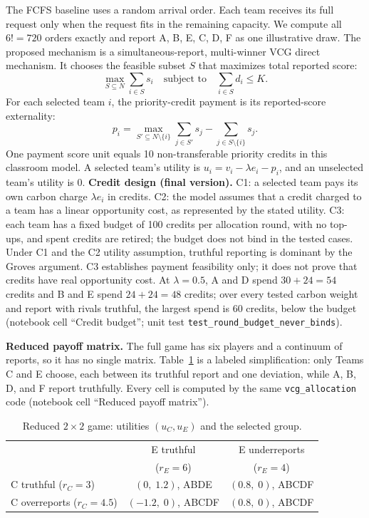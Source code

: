 The FCFS baseline uses a random arrival order. Each team receives its full request only when the request fits in the remaining capacity. We compute all $6!=720$ orders exactly and report A, B, E, C, D, F as one illustrative draw. The proposed mechanism is a simultaneous-report, multi-winner VCG direct mechanism. It chooses the feasible subset $S$ that maximizes total reported score:
\[
\max_{S \subseteq N}\sum_{i\in S}s_i
\quad \text{subject to} \quad
\sum_{i\in S}d_i\leq K.
\]
For each selected team $i$, the priority-credit payment is its reported-score externality:
\[
p_i=
\max_{S'\subseteq N\setminus\{i\}}\sum_{j\in S'}s_j
-
\sum_{j\in S\setminus\{i\}}s_j.
\]
One payment score unit equals 10 non-transferable priority credits in this classroom model. A selected team's utility is \ensuremath{u_i=v_i-\lambda e_i-p_i}, and an unselected team's utility is \ensuremath{0}. \textbf{Credit design (final version).} C1: a selected team pays its own carbon charge \ensuremath{\lambda e_i} in credits. C2: the model assumes that a credit charged to a team has a linear opportunity cost, as represented by the stated utility. C3: each team has a fixed budget of 100 credits per allocation round, with no top-ups, and spent credits are retired; the budget does not bind in the tested cases. Under C1 and the C2 utility assumption, truthful reporting is dominant by the Groves argument. C3 establishes payment feasibility only; it does not prove that credits have real opportunity cost. At \ensuremath{\lambda=0.5}, A and D spend \ensuremath{30+24=54} credits and B and E spend \ensuremath{24+24=48} credits; over every tested carbon weight and report with rivals truthful, the largest spend is 60 credits, below the budget (notebook cell ``Credit budget''; unit test \texttt{test\_round\_budget\_never\_binds}).

\textbf{Reduced payoff matrix.} The full game has six players and a continuum of reports, so it has no single matrix. Table~\ref{tab:matrix} is a labeled simplification: only Teams C and E choose, each between its truthful report and one deviation, while A, B, D, and F report truthfully. Every cell is computed by the same \texttt{vcg\_allocation} code (notebook cell ``Reduced payoff matrix'').

\begin{table}[h]
\centering
\caption{Reduced $2\times2$ game: utilities $(u_C,u_E)$ and the selected group.}
\label{tab:matrix}
\footnotesize
\setlength{\tabcolsep}{4pt}
\begin{tabular}{lcc}
\toprule
 & E truthful & E underreports \\
 & ($r_E=6$) & ($r_E=4$) \\
\midrule
C truthful ($r_C=3$) & $(0,\;1.2)$, ABDE & $(0.8,\;0)$, ABCDF \\
C overreports ($r_C=4.5$) & $(-1.2,\;0)$, ABCDF & $(0.8,\;0)$, ABCDF \\
\bottomrule
\end{tabular}
\end{table}

